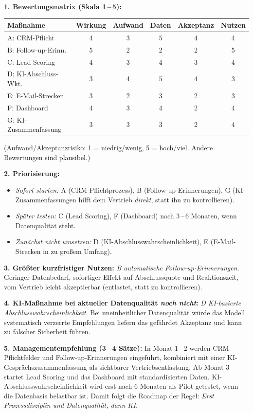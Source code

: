 \documentclass[11pt,a4paper,oneside]{article}
\begin{document}
\begin{loesungbox}
\textbf{1. Bewertungsmatrix (Skala 1\,--\,5):}

\smallskip
\begin{tabularx}{\linewidth}{@{}lccccc@{}}
\toprule
\textbf{Maßnahme} & \textbf{Wirkung} & \textbf{Aufwand} & \textbf{Daten} & \textbf{Akzeptanz} & \textbf{Nutzen} \\
\midrule
A: CRM-Pflicht        & 4 & 3 & 5 & 4 & 4 \\
B: Follow-up-Erinn.   & 5 & 2 & 2 & 2 & 5 \\
C: Lead Scoring       & 4 & 3 & 4 & 3 & 4 \\
D: KI-Abschluss-Wkt.  & 3 & 4 & 5 & 4 & 3 \\
E: E-Mail-Strecken    & 3 & 2 & 3 & 2 & 3 \\
F: Dashboard          & 4 & 3 & 4 & 2 & 4 \\
G: KI-Zusammenfassung & 3 & 3 & 3 & 2 & 4 \\
\bottomrule
\end{tabularx}

\smallskip
(Aufwand/Akzeptanzrisiko: 1 = niedrig/wenig, 5 = hoch/viel. Andere Bewertungen sind plausibel.)

\smallskip
\textbf{2. Priorisierung:}
\begin{itemize}
  \item \emph{Sofort starten:} A (CRM-Pflichtprozess), B (Follow-up-Erinnerungen), G (KI-Zusammenfassungen \textendash{} hilft dem Vertrieb \emph{direkt}, statt ihn zu kontrollieren).
  \item \emph{Später testen:} C (Lead Scoring), F (Dashboard) \textendash{} nach 3\,--\,6 Monaten, wenn Datenqualität steht.
  \item \emph{Zunächst nicht umsetzen:} D (KI-Abschlusswahrscheinlichkeit), E (E-Mail-Strecken in zu großem Umfang).
\end{itemize}

\textbf{3. Größter kurzfristiger Nutzen:} \emph{B \textendash{} automatische Follow-up-Erinnerungen}. Geringer Datenbedarf, sofortiger Effekt auf Abschlussquote und Reaktionszeit, vom Vertrieb leicht akzeptierbar (entlastet, statt zu kontrollieren).

\smallskip
\textbf{4. KI-Maßnahme bei aktueller Datenqualität \emph{noch nicht}:} \emph{D \textendash{} KI-basierte Abschlusswahrscheinlichkeit}. Bei uneinheitlicher Datenqualität würde das Modell systematisch verzerrte Empfehlungen liefern \textendash{} das gefährdet Akzeptanz und kann zu falscher Sicherheit führen.

\smallskip
\textbf{5. Managementempfehlung (3\,--\,4 Sätze):}
In Monat 1\,--\,2 werden CRM-Pflichtfelder und Follow-up-Erinnerungen eingeführt, kombiniert mit einer KI-Gesprächszusammenfassung als sichtbarer Vertriebsentlastung. Ab Monat 3 startet Lead Scoring und das Dashboard mit standardisierten Daten. KI-Abschlusswahrscheinlichkeit wird erst nach 6 Monaten als Pilot getestet, wenn die Datenbasis belastbar ist. Damit folgt die Roadmap der Regel: \emph{Erst Prozessdisziplin und Datenqualität, dann KI.}
\end{loesungbox}
\end{document}
